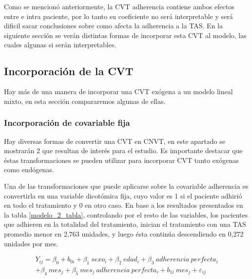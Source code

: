 \documentclass[spanish]{article}
\numberwithin{figure}{subsection}
\numberwithin{equation}{subsection}
\numberwithin{table}{subsection}
\begin{document}
Como se mencionó anteriormente, la CVT adherencia contiene ambos efectos entre e
intra paciente, por lo tanto su coeficiente no será interpretable y será dificil
sacar conclusiones sobre como afecta la adherencia a la TAS. En la siguiente
sección se verán distintas formas de incorporar esta CVT al modelo, las cuales
algunas si serán interpretables.

\subsection{Incorporación de la CVT}

Hay más de una manera de incorporar una CVT exógena a un modelo lineal mixto, en
esta sección compararemos algunas de ellas.

\subsubsection{Incorporación de covariable fija}

Hay diversas formas de convertir una CVT en CNVT, en este apartado se mostrarán
2 que resultan de interés para el estudio. Es importante destacar que éstas
transformaciones se pueden utilizar para incorporar CVT tanto exógenas como
endógenas.

Una de las transformaciones que puede aplicarse sobre la covariable adherencia
es convertirla en una variable dicotómica fija, cuyo valor es 1 si el paciente
adhirió en todo el tratamiento y 0 en otro caso. En base a los resultados
presentados en la tabla \ref{modelo_2_tabla}, controlando por el resto de las
variables, los pacientes que adhieren en la totalidad del tratamiento, inician
el tratamiento con una TAS promedio menor en 2,763 unidades, y luego ésta
continúa descendiendo en 0,272 unidades por mes.

\begin{multline}
	\label{modelo_2}
	Y_{ij} = \beta_0 + b_{0i} + \beta_1\ sexo_i + \beta_2\ edad_i + \beta_3\ adherencia\ perfecta_i \\
	+ \beta_4\ mes_j + \beta_5\ mes_j\ adherencia\ perfecta_i + b_{1i}\ mes_j + \varepsilon_{ij}
\end{multline}
\end{document}
